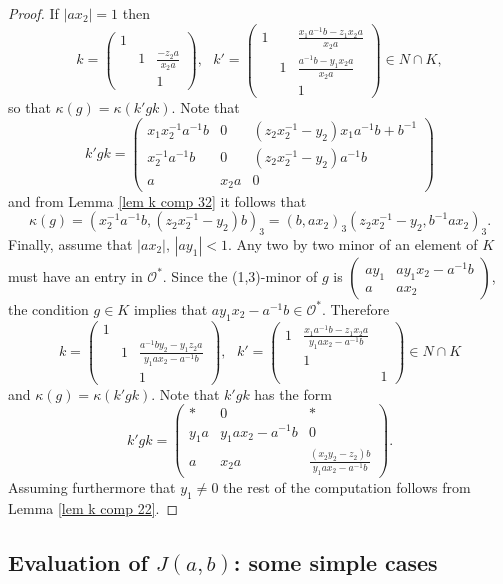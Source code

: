 \documentclass[12pt]{amsart}
\newcommand{\abs}[1]{\left|{#1}\right|}
\renewcommand{\O}{\mathcal{O}}
\newcommand{\sm}[4]{\left(\begin{smallmatrix}{#1}&{#2}\\{#3}&{#4}\end{smallmatrix}\right)}
\theoremstyle{remark}
\begin{document}
\begin{proof}
If $\abs{ax_2}=1$ then
\[
k=\begin{pmatrix} 1 &  &  \\ & 1 & \frac{-z_2a}{x_2a} \\ & & 1 \end{pmatrix} 
, \ \ \ k'=\begin{pmatrix}  1 & & \frac{x_1a^{-1}b-z_1x_2a}{x_2a} \\ & 1 & \frac{a^{-1}b-y_1x_2a}{x_2a}\\ & & 1\end{pmatrix}\in N\cap K,
\]
so that $\kappa(g)=\kappa(k'gk)$. Note that
\[
k'gk=\begin{pmatrix}    x_1x_2^{-1}a^{-1} b & 0 & (z_2x_2^{-1}-y_2)x_1a^{-1}b+b^{-1} \\ x_2^{-1}a^{-1} b & 0 & (z_2x_2^{-1}-y_2)a^{-1}b \\ a & x_2 a & 0   \end{pmatrix}
\]
and from Lemma \ref{lem k comp 32} it follows that
\[
\kappa(g)=(x_2^{-1}a^{-1}b,(z_2x_2^{-1}-y_2)b)_3=(b,ax_2)_3(z_2x_2^{-1}-y_2,b^{-1}ax_2)_3.
\]
Finally, assume that $\abs{ax_2},\,\abs{ay_1}<1$. Any two by two minor of an element of $K$ must have an entry in $\O^*$. Since the (1,3)-minor of $g$ is $\sm{ay_1}{ay_1x_2-a^{-1}b}{a}{ax_2}$, the condition $g\in K$ implies that $ay_1x_2-a^{-1}b\in\O^*$. 
Therefore
\[
k=\begin{pmatrix} 1 &  &  \\ & 1 & \frac{a^{-1}by_2-y_1z_2 a}{y_1a x_2-a^{-1}b} \\ & & 1 \end{pmatrix} 
, \ \ \ k'=\begin{pmatrix}  1 & \frac{x_1a^{-1}b-z_1x_2a}{ y_1a x_2-a^{-1}b} & \\ & 1 & \\ & & 1\end{pmatrix}\in N\cap K
\]
and $\kappa(g)=\kappa(k'gk)$. Note that $k'gk$ has the form
\[
k'gk=\begin{pmatrix}    
* & 0 & *
\\ y_1a & y_1a x_2-a^{-1}b & 0 \\ a & x_2 a & \frac{(x_2y_2-z_2)b}{y_1a x_2-a^{-1}b} \end{pmatrix}.
\]
Assuming furthermore that $y_1\ne 0$ the rest of the computation follows from Lemma \ref{lem k comp 22}.
\end{proof}

\subsection{Evaluation of $J(a,b)$: some simple cases}
\end{document}

